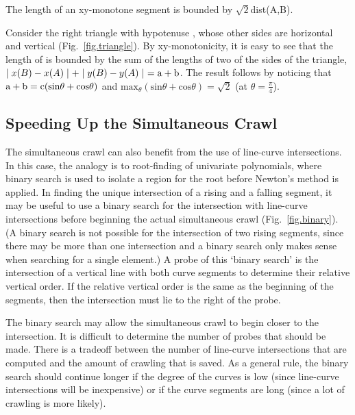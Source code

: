 \begin{lemma}
\label{lem-bound}
The length of an xy-monotone segment  is bounded by $\sqrt{2}$dist(A,B).
\end{lemma}
Consider the right triangle with hypotenuse , whose other sides are horizontal
and vertical (Fig.~\ref{fig.triangle}).
By xy-monotonicity, it is easy to see that the length of  is bounded by
the sum of the lengths of
two of the sides of the triangle, $\mid x(B) - x(A) \mid + \mid y(B) - y(A) \mid\ = 
{\rm a} + {\rm b}$.
The result follows by noticing that ${\rm a} + {\rm b} = 
{\rm c}(\mbox{sin}\theta + \mbox{cos}\theta)$
and $\mbox{max}_{\theta} (\mbox{sin}\theta + \mbox{cos}\theta) = \sqrt{2}$ 
(at $\theta = \frac{\pi}{4}$).
\QED


\subsection{Speeding Up the Simultaneous Crawl}
\label{sub-linecurve2}

The simultaneous crawl can also benefit from the use of line-curve intersections.
In this case, the analogy is to root-finding of univariate polynomials, where binary search 
is used to isolate a region for the root before Newton's method is applied.
In finding the unique intersection of a rising and a falling segment, it may be useful to 
use a binary search for the intersection with line-curve intersections
before beginning the actual simultaneous crawl (Fig.~\ref{fig.binary}).
(A binary 
	search is not possible for the intersection of two rising segments, since
	there may be more than one intersection and a binary search only makes sense when
	searching for a single element.)
A probe of this `binary search' is the intersection of a vertical line with both curve 
segments to determine their relative vertical order.  
If the relative vertical order is the same as the beginning of the segments, 
then the intersection must lie to the right of the probe.


The binary search may allow the simultaneous crawl to begin closer to the intersection.
It is difficult to determine the number of probes that should be made.
There is a tradeoff between the number of line-curve intersections
that are computed and the amount of crawling that is saved.
As a general rule, the binary search should continue longer if the degree
of the curves is low (since line-curve intersections will be inexpensive) or
if the curve segments are long (since a lot of crawling is more likely).

